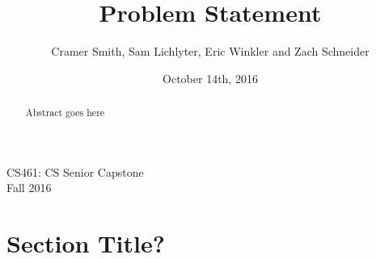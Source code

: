 \documentclass[letterpaper10pt,titlepage,draftclsnofoot,onecolumn] {IEEEtran}
\title{Problem Statement}
\author{Cramer Smith, Sam Lichlyter, Eric Winkler and Zach Schneider}
\date{October 14th, 2016}
\begin{document}
\begin{titlepage}

\maketitle
\begin{center}
CS461: CS Senior Capstone \\
Fall 2016

\begin{abstract}
Abstract goes here
\end{abstract}
\end{center}

\end{titlepage}

\section{Section Title?}
\end{document}
